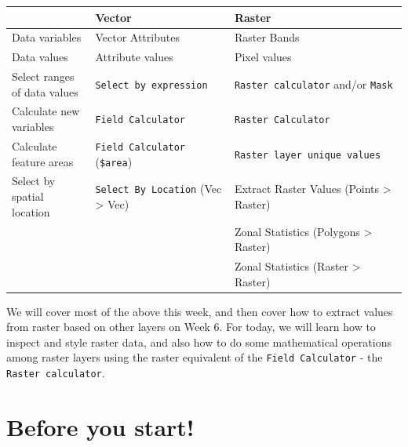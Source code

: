 \documentclass[
  letterpaper,
  DIV=11,
  numbers=noendperiod]{scrreprt}
\begin{document}
\begin{longtable}[]{@{}
  >{\raggedright\arraybackslash}p{}
  >{\raggedright\arraybackslash}p{}
  >{\raggedright\arraybackslash}p{}@{}}
\toprule\noalign{}
\begin{minipage}[b]{\linewidth}\raggedright
\end{minipage} & \begin{minipage}[b]{\linewidth}\raggedright
Vector
\end{minipage} & \begin{minipage}[b]{\linewidth}\raggedright
Raster
\end{minipage} \\
\midrule\noalign{}
\endhead
\bottomrule\noalign{}
\endlastfoot
Data variables & Vector Attributes & Raster Bands \\
Data values & Attribute values & Pixel values \\
Select ranges of data values & \texttt{Select\ by\ expression} &
\texttt{Raster\ calculator} and/or \texttt{Mask} \\
Calculate new variables & \texttt{Field\ Calculator} &
\texttt{Raster\ Calculator} \\
Calculate feature areas & \texttt{Field\ Calculator} (\texttt{\$area}) &
\texttt{Raster\ layer\ unique\ values} \\
Select by spatial location & \texttt{Select\ By\ Location} (Vec
\textgreater{} Vec) & Extract Raster Values (Points \textgreater{}
Raster) \\
& & Zonal Statistics (Polygons \textgreater{} Raster) \\
& & Zonal Statistics (Raster \textgreater{} Raster) \\
\end{longtable}

We will cover most of the above this week, and then cover how to extract
values from raster based on other layers on Week 6. For today, we will
learn how to inspect and style raster data, and also how to do some
mathematical operations among raster layers using the raster equivalent
of the \texttt{Field\ Calculator} - the \texttt{Raster\ calculator}.

\section{Before you start!}\label{before-you-start-3}
\end{document}
